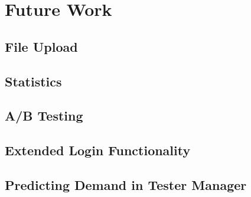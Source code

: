 \chapter{Future Work}

\section{File Upload}


\section{Statistics}


\section{A/B Testing}


\section{Extended Login Functionality}


\section{Predicting Demand in Tester Manager}


